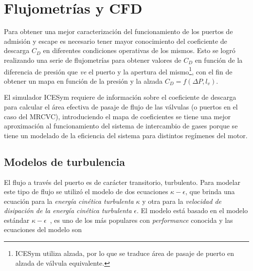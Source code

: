 \section{Flujometrías y CFD}
%
Para obtener una mejor caracterización del funcionamiento de los puertos de
admisión y escape es necesario tener mayor conocimiento del coeficiente de
descarga $C_{D}$ en diferentes condiciones operativas de los mismos.
%
Esto se logró realizando una serie de flujometrías para obtener valores de
$C_{D}$ en función de la diferencia de presión que \emph{ve} el puerto y la
apertura del mismo\footnote{ICESym utiliza alzada, por lo que se traduce área de
pasaje de puerto en alzada de válvula equivalente.}, con el fin de obtener un
mapa en función de la presión y la alzada $C_{D} = f(\Delta P,l_v)$.

El simulador ICESym requiere de información sobre el coeficiente de descarga
para calcular el área efectiva de pasaje de flujo de las válvulas (o puertos en
el caso del MRCVC), introduciendo el mapa de coeficientes se tiene una mejor
aproximación al funcionamiento del sistema de intercambio de gases porque se
tiene un modelado de la eficiencia del sistema para distintos regímenes del
motor.


%
%

\subsection{Modelos de turbulencia}

El flujo a través del puerto es de carácter transitorio, turbulento.
%
Para modelar este tipo de flujo se utilizó el modelo de dos ecuaciones
\emph{$\kappa-\epsilon$}\parencite{wilcox}, que brinda una ecuación para la
\emph{energía cinética turbulenta} $\kappa$ y otra para la \emph{velocidad de
disipación de la energía cinética turbulenta} $\epsilon$.
%
El modelo está basado en el modelo estándar
$\kappa-\epsilon$~\parencite{launderSpalding}, es uno de los más populares con
\emph{performance} conocida y las ecuaciones del modelo son


